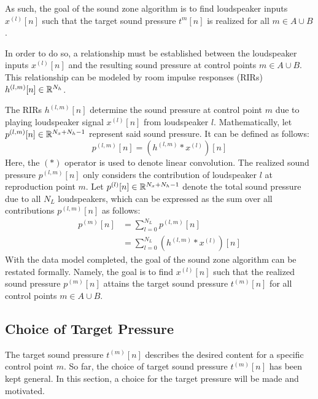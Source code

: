 As such, the goal of the sound zone algorithm is to find loudspeaker inputs $x^{(l)}[n]$ 
such that the target sound pressure $t^{m}[n]$ is realized for all $m\in A \cup B$.

In order to do so, a relationship must be established between the loudspeaker inputs $x^{(l)}[n]$
and the resulting sound pressure at control points $m\in A \cup B$. 
This relationship can be modeled by room impulse responses (RIRs) $h^{(l,m)}[n]\in\mathbb{R}^{N_h}$.

The RIRs $h^{(l,m)}[n]$ determine the sound pressure at control point $m$ due to playing loudspeaker signal $x^{(l)}[n]$ from loudspeaker $l$. 
Mathematically, let $p^{(l,m)}[n]\in\mathbb{R}^{N_x + N_h - 1}$ represent said sound pressure. 
It can be defined as follows:
\begin{equation}
    p^{(l,m)}[n] = \left(h^{(l,m)} \ast x^{(l)}\right)[n]
\end{equation}
Here, the $(\ast)$ operator is used to denote linear convolution. 
The realized sound pressure $p^{(l,m)}[n]$ only considers the contribution of loudspeaker $l$ at reproduction point $m$.
Let $p^{(l)}[n]\in\mathbb{R}^{N_x + N_h - 1}$ denote the total sound pressure due to all $N_L$ loudspeakers,
which can be expressed as the sum over all contributions $p^{(l,m)}[n]$ as follows: 
\begin{align}
    p^{(m)}[n] &= \sum_{l=0}^{N_L} p^{(l,m)}[n] \\
               &= \sum_{l=0}^{N_L} \left(h^{(l,m)} \ast x^{(l)}\right)[n]
\end{align}
With the data model completed, the goal of the sound zone algorithm can be restated formally.
Namely, the goal is to find $x^{(l)}[n]$ such that the realized sound pressure $p^{(m)}[n]$ attains the
target sound pressure $t^{(m)}[n]$ for all control points $m\in A \cup B$.

\subsection{Choice of Target Pressure}
\label{ch:sound_zone:data_model:target_pressure_choice}
The target sound pressure $t^{(m)}[n]$ describes the desired content for a specific control point $m$. 
So far, the choice of target sound pressure $t^{(m)}[n]$ has been kept general. 
In this section, a choice for the target pressure will be made and motivated.

